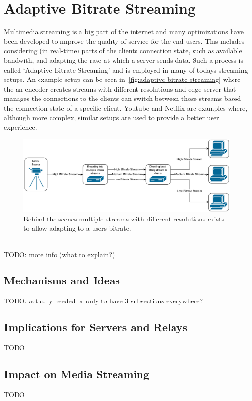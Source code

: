 \section{Adaptive Bitrate Streaming}\label{sec:adaptive_bitrate_streaming}
Multimedia streaming is a big part of the internet and many optimizations have
been developed to improve the quality of service for the end-users.
This includes considering (in real-time) parts of the clients connection state, 
such as available bandwith, and adapting the rate at which a server sends data.
Such a process is called `Adaptive Bitrate Streaming' and is employed in many 
of todays streaming setups.
An example setup can be seen in~\autoref{fig:adaptive-bitrate-streaming} where
the an encoder creates streams with different resolutions and edge server that 
manages the connections to the clients can switch between those streams based 
the connection state of a specific client.
Youtube and Netflix are examples where, although more complex, similar setups
are used to provide a better user experience. 
\begin{figure}[htbp] %
    \centering
    \includegraphics[width=\textwidth]{figures/02_background/adaptive-bitrate-streaming.drawio.pdf}
    \caption[Adaptive streaming schematic]{Behind the scenes multiple streams with different
    resolutions exists to allow adapting to a users bitrate.}\label{fig:adaptive-bitrate-streaming}
\end{figure}
\vspace{1cm}
\\
TODO: more info (what to explain?)

\subsection{Mechanisms and Ideas}
TODO: actually needed or only to have 3 subsections everywhere?

\subsection{Implications for Servers and Relays}
TODO

\subsection{Impact on Media Streaming}
TODO